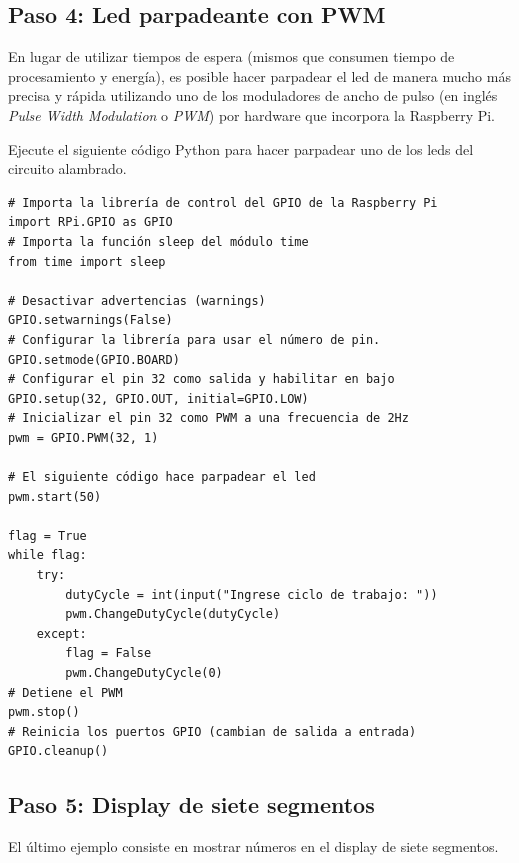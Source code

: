 \documentclass[letterpaper,10.5pt]{article}
\begin{document}
\subsection{Paso 4: Led parpadeante con PWM}%
\label{sec:step4}
En lugar de utilizar tiempos de espera (mismos que consumen tiempo de procesamiento y energía), es posible hacer parpadear el led de manera mucho más precisa y rápida utilizando uno de los moduladores de ancho de pulso (en inglés \emph{Pulse Width Modulation} o \emph{PWM}) por hardware que incorpora la Raspberry Pi.

Ejecute el siguiente código Python para hacer parpadear uno de los leds del circuito alambrado.

\medskip
\begin{lstlisting}
# Importa la librería de control del GPIO de la Raspberry Pi
import RPi.GPIO as GPIO
# Importa la función sleep del módulo time
from time import sleep

# Desactivar advertencias (warnings)
GPIO.setwarnings(False)
# Configurar la librería para usar el número de pin.
GPIO.setmode(GPIO.BOARD)
# Configurar el pin 32 como salida y habilitar en bajo
GPIO.setup(32, GPIO.OUT, initial=GPIO.LOW)
# Inicializar el pin 32 como PWM a una frecuencia de 2Hz
pwm = GPIO.PWM(32, 1)

# El siguiente código hace parpadear el led
pwm.start(50)

flag = True
while flag:
	try:
		dutyCycle = int(input("Ingrese ciclo de trabajo: "))
		pwm.ChangeDutyCycle(dutyCycle)
	except:
		flag = False
		pwm.ChangeDutyCycle(0)
# Detiene el PWM
pwm.stop()
# Reinicia los puertos GPIO (cambian de salida a entrada)
GPIO.cleanup()
\end{lstlisting}


%
%
\subsection{Paso 5: Display de siete segmentos}%
\label{sec:step5}
El último ejemplo consiste en mostrar números en el display de siete segmentos.
\end{document}
